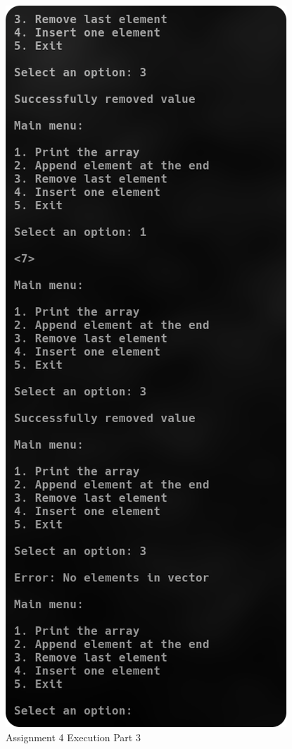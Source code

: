 \documentclass[
	letterpaper, %
	10pt, %
]{CSUniSchoolLabReport}
\begin{document}
  \begin{figure}[H]
    \centering
    \includegraphics[height=.7\textheight]{Figures/6_4-3.png}
    \caption{Assignment 4 Execution Part 3}
    \label{fig:8}
  \end{figure}
\end{document}

